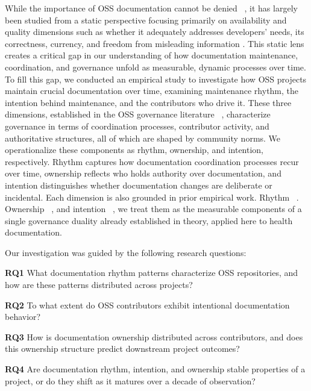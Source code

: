 \documentclass[10pt,conference]{IEEEtran}
\newcommand{\EAdejumo}[1]{\textcolor{red}{{\bfseries [[#1]]}}}
\begin{document}
While the importance of OSS documentation cannot be denied ~\cite{coelho2017modern}, it has largely been studied from a static perspective focusing primarily on availability and quality dimensions such as whether it adequately addresses developers' needs, its correctness, currency, and freedom from misleading information \cite{aversano2017evaluating}. This static lens creates a critical gap in our  understanding of how documentation maintenance, coordination, and governance unfold as measurable, dynamic processes over time. 
To fill this gap, we conducted an empirical study to investigate how OSS projects maintain crucial documentation \cite{github_community_health} over time, examining maintenance rhythm, the intention behind maintenance, and the contributors who drive it. 
These three dimensions, established in the OSS governance literature ~\cite{shaikh2017governing}, characterize governance in terms of coordination processes, contributor activity, and authoritative structures, all of which are shaped by community norms. We operationalize these components as rhythm, ownership, and intention, respectively. Rhythm captures how documentation coordination processes recur over time, ownership reflects who holds authority over documentation, and intention distinguishes whether documentation changes are deliberate or incidental. Each dimension is also grounded in prior empirical work. Rhythm ~\cite{adejumo2026commits,destefanis2025introducing}. Ownership ~\cite{cosentino2015assessing,jabrayilzade2022bus}, and intention ~\cite{zeng2025first}, we treat them as the measurable components of a single governance duality already established in theory, applied here to health documentation. 

Our investigation was guided by the following research questions:
\begin{description}
    \item \textbf{RQ1} What documentation rhythm patterns characterize OSS repositories, and how are these patterns distributed across projects? 
    \item \textbf{RQ2} To what extent do OSS contributors exhibit intentional documentation behavior?
    \item \textbf{RQ3} How is documentation ownership distributed across contributors, and does this ownership structure predict downstream project outcomes?
    \item \textbf{RQ4} Are documentation rhythm, intention, and ownership stable properties of a project, or do they shift as it matures over a decade of observation?
\end{description}
\end{document}
